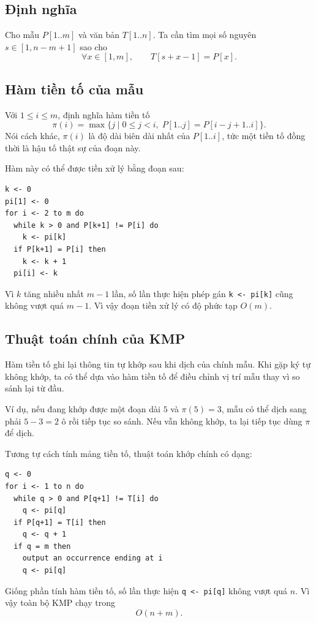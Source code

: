 \documentclass[11pt]{article}
\begin{document}
\subsection{Định nghĩa}

Cho mẫu $P[1..m]$ và văn bản $T[1..n]$. Ta cần tìm mọi số nguyên
$s\in[1,n-m+1]$ sao cho
\[
  \forall x\in[1,m],\qquad T[s+x-1]=P[x].
\]

\subsection{Hàm tiền tố của mẫu}

Với $1\le i\le m$, định nghĩa hàm tiền tố
\[
  \pi(i)=\max\{j\mid 0\le j<i,\; P[1..j]=P[i-j+1..i]\}.
\]
Nói cách khác, $\pi(i)$ là độ dài biên dài nhất của $P[1..i]$, tức một tiền tố
đồng thời là hậu tố thật sự của đoạn này.

Hàm này có thể được tiền xử lý bằng đoạn sau:

\begin{verbatim}
k <- 0
pi[1] <- 0
for i <- 2 to m do
  while k > 0 and P[k+1] != P[i] do
    k <- pi[k]
  if P[k+1] = P[i] then
    k <- k + 1
  pi[i] <- k
\end{verbatim}

Vì $k$ tăng nhiều nhất $m-1$ lần, số lần thực hiện phép gán
\texttt{k <- pi[k]} cũng không vượt quá $m-1$. Vì vậy đoạn tiền xử lý có độ
phức tạp $O(m)$.

\subsection{Thuật toán chính của KMP}

Hàm tiền tố ghi lại thông tin tự khớp sau khi dịch của chính mẫu. Khi gặp ký
tự không khớp, ta có thể dựa vào hàm tiền tố để điều chỉnh vị trí mẫu thay vì
so sánh lại từ đầu.

Ví dụ, nếu đang khớp được một đoạn dài $5$ và $\pi(5)=3$, mẫu có thể dịch
sang phải $5-3=2$ ô rồi tiếp tục so sánh. Nếu vẫn không khớp, ta lại tiếp tục
dùng $\pi$ để dịch.

Tương tự cách tính mảng tiền tố, thuật toán khớp chính có dạng:

\begin{verbatim}
q <- 0
for i <- 1 to n do
  while q > 0 and P[q+1] != T[i] do
    q <- pi[q]
  if P[q+1] = T[i] then
    q <- q + 1
  if q = m then
    output an occurrence ending at i
    q <- pi[q]
\end{verbatim}

Giống phần tính hàm tiền tố, số lần thực hiện \texttt{q <- pi[q]} không vượt
quá $n$. Vì vậy toàn bộ KMP chạy trong
\[
  O(n+m).
\]
\end{document}
